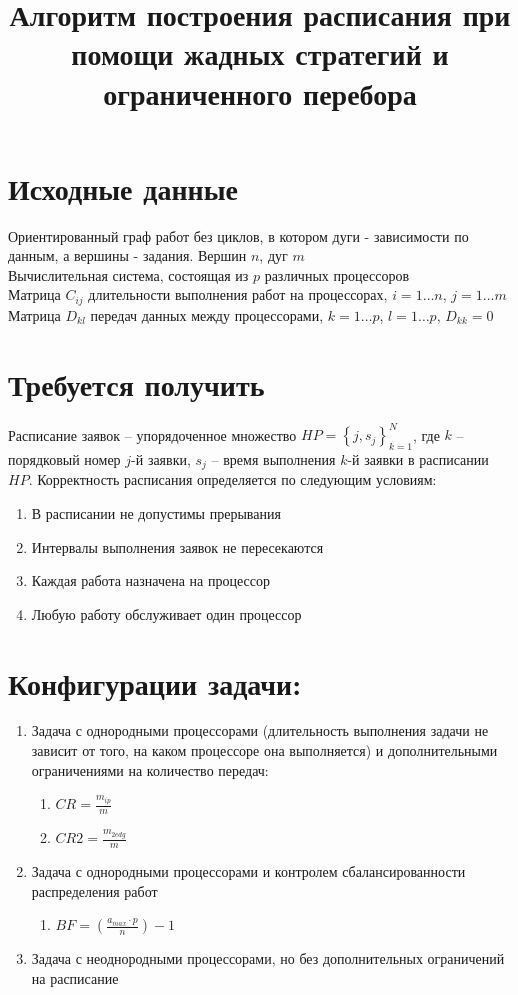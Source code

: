 \documentclass{article}
\title{Алгоритм построения расписания при помощи жадных стратегий и ограниченного перебора}
\begin{document}
\section{Исходные данные}

Ориентированный граф работ  без циклов, в котором дуги - зависимости по данным, а вершины - задания. Вершин $n$, дуг $m$ \\
Вычислительная система, состоящая из $p$ различных процессоров \\
Матрица $C_{ij}$ длительности выполнения работ на процессорах, $i = 1\dots n$, $j=1\dots m$ \\
Матрица $D_{kl}$ передач данных между процессорами, $k = 1\dots p$, $l = 1\dots p$, $D_{kk} = 0$

\section{Требуется получить}
Расписание заявок – упорядоченное множество $HP=\left\{ j, s_j \right\}_{k=1}^N$, где $k$ – порядковый номер $j$-й заявки, $s_j$ – время выполнения $k$-й заявки в расписании $HP$. Корректность расписания определяется по следующим условиям:
\begin{enumerate}
    \item В расписании не допустимы прерывания
    \item Интервалы выполнения заявок не пересекаются
    \item Каждая работа назначена на процессор
    \item Любую работу обслуживает один процессор
\end{enumerate}
\section{Конфигурации задачи:}
\begin{enumerate}
    \item Задача с однородными процессорами (длительность выполнения задачи не зависит от того, на каком процессоре она выполняется) и дополнительными ограничениями на количество передач:
    \begin{enumerate}
        \item $CR = \frac{m_{ip}}{m}$
        \item $CR2 = \frac{m_{2edg}}{m}$
    \end{enumerate}
    \item Задача с однородными процессорами и контролем сбалансированности распределения работ
    \begin{enumerate}
        \item $BF = \left( \frac{a_{max} \cdot p}{n} \right) - 1$
    \end{enumerate}
    \item Задача с неоднородными процессорами, но без дополнительных ограничений на расписание
\end{enumerate}
\end{document}
